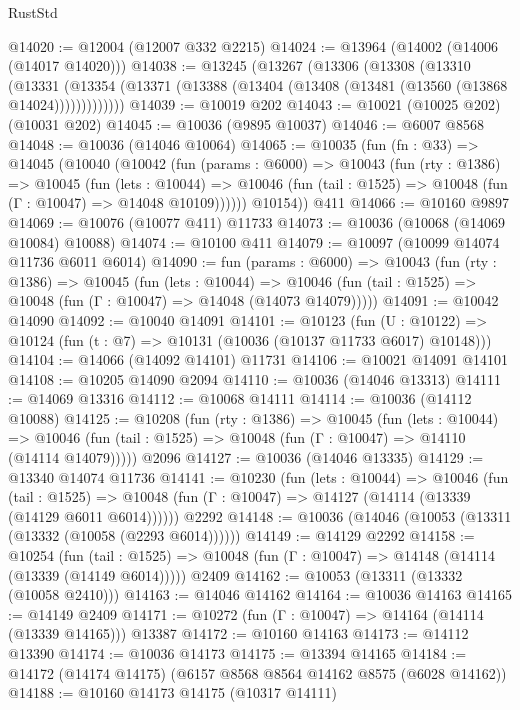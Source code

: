 \begin{lexlean}{RustStd}
\begin{coremodule}
{{@14020 := @12004 (@12007 @332 @2215)
@14024 := @13964 (@14002 (@14006 (@14017 @14020)))
@14038 := @13245
    (@13267
      (@13306
        (@13308
          (@13310
            (@13331
              (@13354 (@13371 (@13388 (@13404 (@13408 (@13481 (@13560 (@13868 @14024)))))))))))))
@14039 := @10019 @202
@14043 := @10021 (@10025 @202) (@10031 @202)
@14045 := @10036 (@9895 @10037)
@14046 := @6007 @8568
@14048 := @10036 (@14046 @10064)
@14065 := @10035
    (fun (fn : @33) =>
    @14045
      (@10040
        (@10042
          (fun (params : @6000) =>
          @10043
            (fun (rty : @1386) =>
            @10045
              (fun (lets : @10044) =>
              @10046 (fun (tail : @1525) => @10048 (fun (Γ : @10047) => @14048 @10109))))))
        @10154))
    @411
@14066 := @10160 @9897
@14069 := @10076 (@10077 @411) @11733
@14073 := @10036 (@10068 (@14069 @10084) @10088)
@14074 := @10100 @411
@14079 := @10097 (@10099 @14074 @11736 @6011 @6014)
@14090 := fun (params : @6000) =>
  @10043
    (fun (rty : @1386) =>
    @10045
      (fun (lets : @10044) =>
      @10046 (fun (tail : @1525) => @10048 (fun (Γ : @10047) => @14048 (@14073 @14079)))))
@14091 := @10042 @14090
@14092 := @10040 @14091
@14101 := @10123
    (fun (U : @10122) => @10124 (fun (t : @7) => @10131 (@10036 (@10137 @11733 @6017) @10148)))
@14104 := @14066 (@14092 @14101) @11731
@14106 := @10021 @14091 @14101
@14108 := @10205 @14090 @2094
@14110 := @10036 (@14046 @13313)
@14111 := @14069 @13316
@14112 := @10068 @14111
@14114 := @10036 (@14112 @10088)
@14125 := @10208
    (fun (rty : @1386) =>
    @10045
      (fun (lets : @10044) =>
      @10046 (fun (tail : @1525) => @10048 (fun (Γ : @10047) => @14110 (@14114 @14079)))))
    @2096
@14127 := @10036 (@14046 @13335)
@14129 := @13340 @14074 @11736
@14141 := @10230
    (fun (lets : @10044) =>
    @10046
      (fun (tail : @1525) =>
      @10048 (fun (Γ : @10047) => @14127 (@14114 (@13339 (@14129 @6011 @6014))))))
    @2292
@14148 := @10036 (@14046 (@10053 (@13311 (@13332 (@10058 (@2293 @6014))))))
@14149 := @14129 @2292
@14158 := @10254
    (fun (tail : @1525) => @10048 (fun (Γ : @10047) => @14148 (@14114 (@13339 (@14149 @6014)))))
    @2409
@14162 := @10053 (@13311 (@13332 (@10058 @2410)))
@14163 := @14046 @14162
@14164 := @10036 @14163
@14165 := @14149 @2409
@14171 := @10272 (fun (Γ : @10047) => @14164 (@14114 (@13339 @14165))) @13387
@14172 := @10160 @14163
@14173 := @14112 @13390
@14174 := @10036 @14173
@14175 := @13394 @14165
@14184 := @14172 (@14174 @14175) (@6157 @8568 @8564 @14162 @8575 (@6028 @14162))
@14188 := @10160 @14173 @14175 (@10317 @14111)
}}
\end{coremodule}
\end{lexlean}
